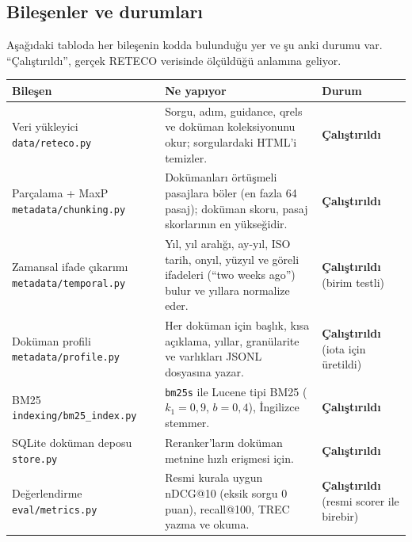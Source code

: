 \documentclass[11pt,a4paper]{article}
\newcommand{\OK}{\textcolor{ok}{\textbf{Çalıştırıldı}}}
\begin{document}
\subsection{Bileşenler ve durumları}
Aşağıdaki tabloda her bileşenin kodda bulunduğu yer ve şu anki durumu var. ``Çalıştırıldı'',
gerçek RETECO verisinde ölçüldüğü anlamına geliyor.

\medskip
\noindent\begin{tabularx}{\textwidth}{>{\raggedright\arraybackslash}p{3.6cm} L >{\raggedright\arraybackslash}p{2.9cm}}
\toprule
\textbf{Bileşen} & \textbf{Ne yapıyor} & \textbf{Durum} \\
\midrule
Veri yükleyici \newline\scriptsize\texttt{data/reteco.py} &
  Sorgu, adım, guidance, qrels ve doküman koleksiyonunu okur; sorgulardaki HTML'i temizler. & \OK \\
Parçalama + MaxP \newline\scriptsize\texttt{metadata/chunking.py} &
  Dokümanları örtüşmeli pasajlara böler (en fazla 64 pasaj); doküman skoru, pasaj skorlarının
  en yükseğidir. & \OK \\
Zamansal ifade çıkarımı \newline\scriptsize\texttt{metadata/temporal.py} &
  Yıl, yıl aralığı, ay-yıl, ISO tarih, onyıl, yüzyıl ve göreli ifadeleri (``two weeks ago'')
  bulur ve yıllara normalize eder. & \OK{} \newline\scriptsize(birim testli) \\
Doküman profili \newline\scriptsize\texttt{metadata/profile.py} &
  Her doküman için başlık, kısa açıklama, yıllar, granülarite ve varlıkları JSONL dosyasına
  yazar. & \OK{} \newline\scriptsize(iota için üretildi) \\
BM25 \newline\scriptsize\texttt{indexing/bm25\_index.py} &
  \texttt{bm25s} ile Lucene tipi BM25 ($k_1{=}0{,}9$, $b{=}0{,}4$), İngilizce stemmer. & \OK \\
SQLite doküman deposu \newline\scriptsize\texttt{store.py} &
  Reranker'ların doküman metnine hızlı erişmesi için. & \OK \\
Değerlendirme \newline\scriptsize\texttt{eval/metrics.py} &
  Resmi kurala uygun nDCG@10 (eksik sorgu 0 puan), recall@100, TREC yazma ve okuma. & \OK{}
  \newline\scriptsize(resmi scorer ile birebir) \\

\end{tabularx}
\end{document}
